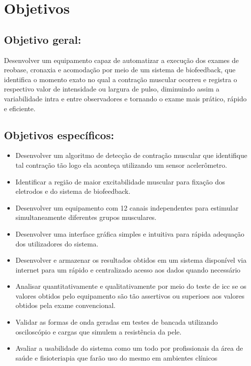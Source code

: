 \section{Objetivos}

\subsection{Objetivo geral:}

Desenvolver um equipamento capaz de automatizar a execução dos exames de reobase, cronaxia e acomodação por meio de um sistema de biofeedback, que identifica o momento exato no qual a contração muscular ocorreu e registra o respectivo valor de intensidade ou largura de pulso, diminuindo assim a variabilidade intra e entre observadores e tornando o exame mais prático, rápido e eficiente.

\subsection{Objetivos específicos:}

\begin{itemize}
    \item Desenvolver um algoritmo de detecção de contração muscular que identifique tal contração tão logo ela aconteça utilizando um sensor acelerômetro.
    \item Identificar a região de maior excitabilidade muscular para fixação dos eletrodos e do sistema de biofeedback.
    \item Desenvolver um equipamento com 12 canais independentes para estimular simultaneamente diferentes grupos musculares.
    \item Desenvolver uma interface gráfica simples e intuitiva para rápida adequação dos utilizadores do sistema.
    \item Desenvolver e armazenar os resultados obtidos em um sistema disponível via internet para um rápido e centralizado acesso aos dados quando necessário
    \item Analisar quantitativamente e qualitativamente por meio do teste de \ac{icc} se os valores obtidos pelo equipamento são tão assertivos ou superioes aos valores obtidos pela exame convencional.
    \item Validar as formas de onda geradas em testes de bancada utilizando osciloscópio e cargas que simulem a resistência da pele.
    \item Avaliar a usabilidade do sistema como um todo por profissionais da área de saúde e fisioteriapia que farão uso do mesmo em ambientes clínicos
\end{itemize}